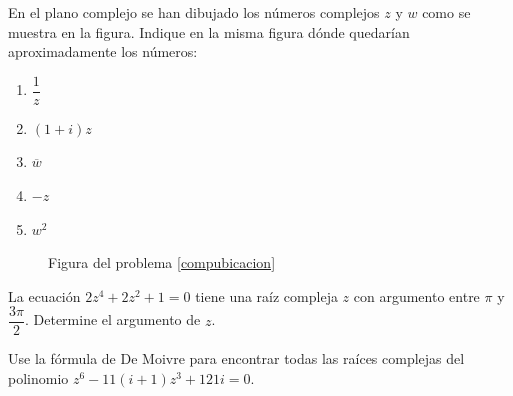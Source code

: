 \begin{prob} \label{compubicacion}
En el plano complejo se han dibujado los números complejos $z$ y $w$ como se muestra en la figura. Indique en la misma figura dónde quedarían aproximadamente los números: 

\begin{multicols}{2}
\begin{enumerate}[$a)$]
\item $\dfrac{1}{z}$
\item $(1+i)z$
\item $\overline{w}$ 
\item $-z$ 
\item $w^2$
\end{enumerate}		
		
\begin{figure}[H]
\centering
{}
\caption{Figura del problema \ref{compubicacion}}
\end{figure}
\end{multicols}
\end{prob}
	
\begin{prob} 
La ecuación $2z^4+2z^2+1=0$ tiene una raíz compleja $z$ con argumento entre $\pi$ y $\dfrac{3\pi}{2}$. Determine el argumento de $z$.
\end{prob}		

\begin{prob} 
Use la fórmula de De Moivre para encontrar todas las raíces complejas del polinomio $z^6-11(i+1)z^3+121i=0$.
\end{prob}

